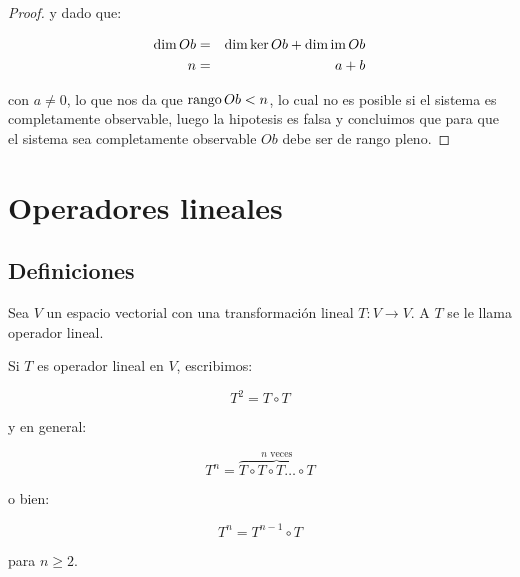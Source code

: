\begin{proof}
			y dado que:

			\begin{eqnarray*}
				\dim{Ob} & = & \dim{\ker{Ob}} + \dim{\operatorname{im}{Ob}} \\
				n & = & a + b \\
			\end{eqnarray*}

			con $a \ne 0$, lo que nos da que $\operatorname{rango}{Ob} < n$, lo cual no es posible si el sistema es completamente observable, luego la hipotesis es falsa y concluimos que para que el sistema sea completamente observable $Ob$ debe ser de rango pleno.
		\end{proof}


\section{Operadores lineales}

	\subsection{Definiciones}

		\begin{definicion}
			Sea $V$ un espacio vectorial con una transformación lineal $T \colon V \to V$.
			A $T$ se le llama operador lineal.
		\end{definicion}

		\begin{observacion}
			Si $T$ es operador lineal en $V$, escribimos:

			\begin{equation}
				T^2 = T \circ T
			\end{equation}

			y en general:

			\begin{equation}
				T^n = \overbrace{T \circ T \circ T \dots \circ T}^{n \text{ veces}}
			\end{equation}

			o bien:

			\begin{equation}
				T^n = T^{n-1} \circ T
			\end{equation}

			para $n \geq 2$.
		\end{observacion}

